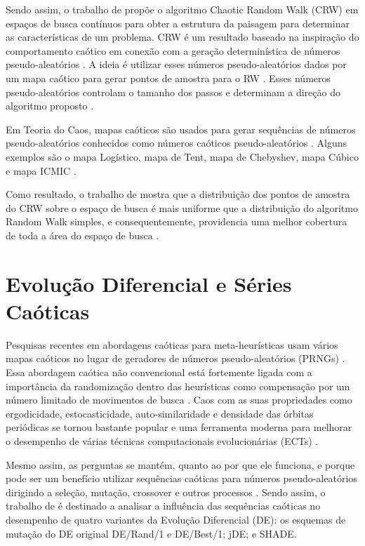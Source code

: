 Sendo assim, o trabalho de \cite{jana} propõe o algoritmo Chaotic Random Walk (CRW) em espaços de busca contínuos para obter a estrutura da paisagem para determinar as características de um problema. CRW é um resultado baseado na inspiração do comportamento caótico em conexão com a geração determinística de números pseudo-aleatórios \cite{jana}. A ideia é utilizar esses números pseudo-aleatórios dados por um mapa caótico para gerar pontos de amostra para o RW \cite{jana}. Esses números pseudo-aleatórios controlam o tamanho dos passos e determinam a direção do algoritmo proposto \cite{jana}.

Em Teoria do Caos, mapas caóticos são usados para gerar sequências de números pseudo-aleatórios conhecidos como números caóticos pseudo-aleatórios \cite{jana}. Alguns exemplos são o mapa Logístico, mapa de Tent, mapa de Chebyshev, mapa Cúbico e mapa ICMIC \cite{jana}.

Como resultado, o trabalho de \cite{jana} mostra que a distribuição dos pontos de amostra do CRW sobre o espaço de busca é mais uniforme que a distribuição do algoritmo Random Walk simples, e consequentemente, providencia uma melhor cobertura de toda a área do espaço de busca \cite{jana}.

\section{Evolução Diferencial e Séries Caóticas}

Pesquisas recentes em abordagens caóticas para meta-heurísticas usam vários mapas caóticos no lugar de geradores de números pseudo-aleatórios (PRNGs) \cite{senkerik}. Essa abordagem caótica não convencional está fortemente ligada com a importância da randomização dentro das heurísticas como compensação por um número limitado de movimentos de busca \cite{senkerik}. Caos com as suas propriedades como ergodicidade, estocasticidade, auto-similaridade e densidade das órbitas periódicas se tornou bastante popular e uma ferramenta moderna para melhorar o desempenho de várias técnicas computacionais evolucionárias (ECTs) \cite{senkerik}.

Mesmo assim, as perguntas se mantém, quanto ao por que ele funciona, e porque pode ser um benefício utilizar sequências caóticas para números pseudo-aleatórios dirigindo a seleção, mutação, crossover e outros processos \cite{senkerik}. Sendo assim, o trabalho de \cite{senkerik} é destinado a analisar a influência das sequências caóticas no desempenho de quatro variantes da Evolução Diferencial (DE): os esquemas de mutação do DE original DE/Rand/1 e DE/Best/1; jDE; e SHADE.

